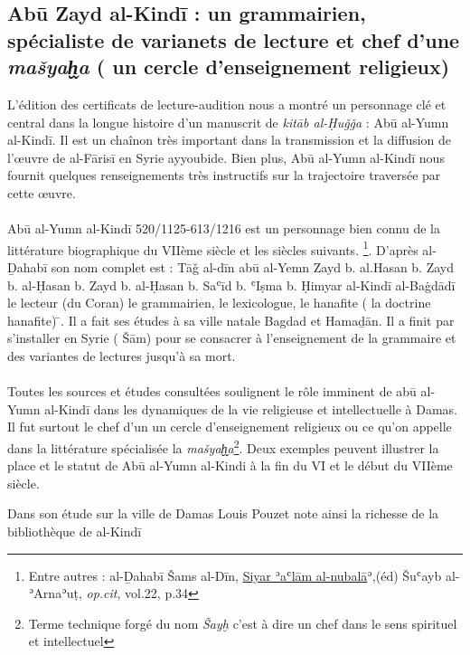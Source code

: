 \documentclass[a4paper,12pt]{report}
\begin{document}
  
 

\newpage
\normalsize
\subsection{Abū Zayd al-Kindī :  un grammairien,  spécialiste de varianets de lecture  et chef d’une \textit{mašyaḫ̬a} ( un cercle d’enseignement religieux)}

L’édition des certificats de lecture-audition   nous a montré un personnage clé et central  dans la longue histoire d'un manuscrit de\textit{ kitāb al-Ḥuǧǧa }: Abū al-Yumn al-Kindī. Il est un chaînon très important dans la transmission et la diffusion de l’œuvre de al-Fārisī en Syrie ayyoubide. Bien plus, Abū al-Yumn al-Kindī nous fournit quelques renseignements  très instructifs sur la trajectoire  traversée par cette œuvre.     
\paragraph{}
Abū al-Yumn al-Kindī 520/1125-613/1216 est un personnage bien connu de la littérature biographique du VIIème siècle et les siècles suivants. \footnote{ Entre autres : al-Ḏahabī Šams al-Dīn, \underline  { Siyar ʾaʿlām al-nubalā}ʾ,(éd) Šuʿayb al-ʾArnaʾuṭ, \textit{op.cit}, vol.22, p.34}. 
D'après  al-Ḏahabī son nom complet est : Tāǧ al-dīn abū al-Yemn Zayd b. al.Hasan b. Zayd b. al-Ḥasan b. Zayd b. al-Ḥasan 
 b. Saʿīd b. ʿIṣma b. Ḥimyar al-Kindī al-Baġdādī le lecteur (du Coran) le grammairien, le lexicologue, le hanafite ( la doctrine hanafite) ̄. Il a fait ses études à sa ville natale Bagdad
 et Hamaḏān. Il a finit par s'installer en Syrie ( Šām) pour se consacrer à l'enseignement de la grammaire et des variantes de lectures jusqu'à sa mort.
\paragraph{}
 Toutes les sources et études consultées soulignent le rôle imminent de abū al-Yumn al-Kindī 
 dans les dynamiques de la vie religieuse et intellectuelle à Damas. Il fut  surtout le chef d'un un cercle d’enseignement religieux ou ce qu'on appelle dans la littérature spécialisée la \textit{mašyaḫ̬a}\footnote{ Terme technique forgé du nom \textit{Šayḫ} c'est à dire un chef   dans le sens spirituel et intellectuel}. Deux exemples peuvent illustrer la place et le statut de Abū al-Yumn al-Kindi à la fin du VI et le début du VIIème siècle. 

 Dans son étude sur la ville de Damas   Louis Pouzet  note  ainsi la richesse de la bibliothèque de al-Kind\=i 
\end{document}
